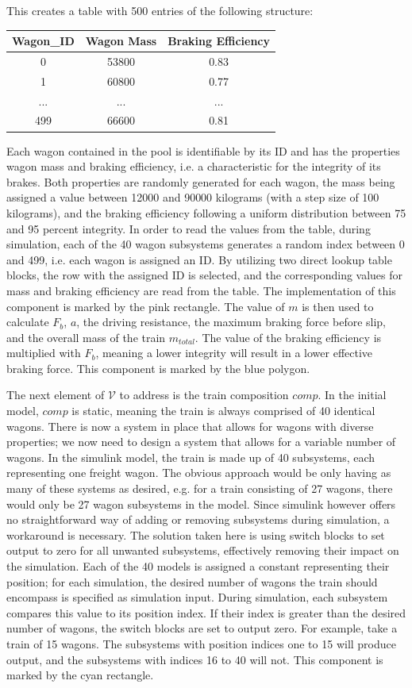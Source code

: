 \noindent
This creates a table with 500 entries of the following structure:

\bigskip
\begin{tabular}{c|c|c}
	Wagon\_ID & Wagon Mass & Braking Efficiency \\
	\hline
	0 & 53800 & 0.83 \\
	\hline
	1 & 60800 & 0.77 \\
	\hline
	... & ... & ... \\
	\hline
	499 & 66600 & 0.81 \\
\end{tabular}
\bigskip

\noindent
Each wagon contained in the pool is identifiable by its ID and has the properties wagon mass and braking efficiency, i.e. a characteristic for the integrity of its brakes. Both properties are randomly generated for each wagon, the mass being assigned a value between 12000 and 90000 kilograms (with a step size of 100 kilograms), and the braking efficiency following a uniform distribution between 75 and 95 percent integrity. In order to read the values from the table, during simulation, each of the 40 wagon subsystems generates a random index between 0 and 499, i.e. each wagon is assigned an ID. By utilizing two direct lookup table blocks, the row with the assigned ID is selected, and the corresponding values for mass and braking efficiency are read from the table. The implementation of this component is marked by the pink rectangle. The value of $m$ is then used to calculate $F_{b}$, $a$, the driving resistance, the maximum braking force before slip, and the overall mass of the train $m_{total}$. The value of the braking efficiency is multiplied with $F_{b}$, meaning a lower integrity will result in a lower effective braking force. This component is marked by the blue polygon.
\par
The next element of ${\mathcal{V}}$ to address is the train composition $comp$. In the initial model, $comp$ is static, meaning the train is always comprised of 40 identical wagons. There is now a system in place that allows for wagons with diverse properties; we now need to design a system that allows for a variable number of wagons. In the simulink model, the train is made up of 40 subsystems, each representing one freight wagon. The obvious approach would be only having as many of these systems as desired, e.g. for a train consisting of 27 wagons, there would only be 27 wagon subsystems in the model. Since simulink however offers no straightforward way of adding or removing subsystems during simulation, a workaround is necessary. The solution taken here is using switch blocks to set output to zero for all unwanted subsystems, effectively removing their impact on the simulation. Each of the 40 models is assigned a constant representing their position; for each simulation, the desired number of wagons the train should encompass is specified as simulation input. During simulation, each subsystem compares this value to its position index. If their index is greater than the desired number of wagons, the switch blocks are set to output zero. For example, take a train of 15 wagons. The subsystems with position indices one to 15 will produce output, and the subsystems with indices 16 to 40 will not. This component is marked by the cyan rectangle.
